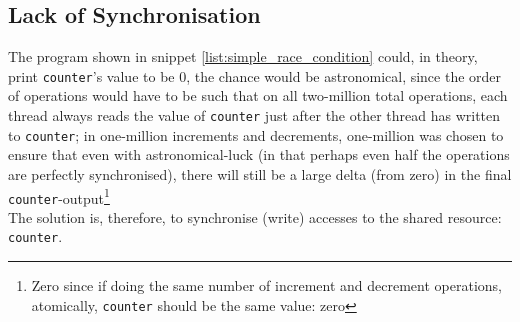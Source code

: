 \subsection{Lack of Synchronisation}
The program shown in snippet \ref{list:simple_race_condition} could, in theory, print \texttt{counter}'s value to be 0, the chance would be astronomical, since the order of operations would have to be such that on all two-million total operations, each thread always reads the value of \texttt{counter} just after the other thread has written to \texttt{counter}; in one-million increments and decrements, one-million was chosen to ensure that even with astronomical-luck (in that perhaps even half the operations are perfectly synchronised), there will still be a large delta (from zero) in the final \texttt{counter}-output\footnote{Zero since if doing the same number of increment and decrement operations, atomically, \texttt{counter} should be the same value: zero}\\
The solution is, therefore, to synchronise (write) accesses to the shared resource: \texttt{counter}.